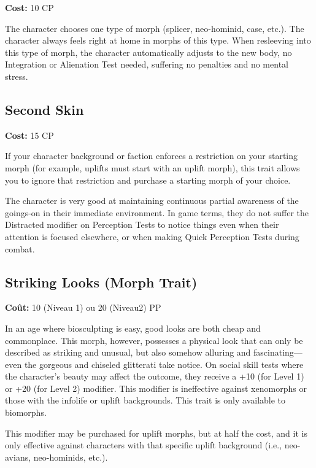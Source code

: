 \textbf{Cost:} 10 CP 

The character chooses one type of morph (splicer, neo-hominid, case, etc.). The character always feels right at home in morphs of this type. When resleeving into this type of morph, the character automatically adjusts to the new body, no Integration or Alienation Test needed, suffering no penalties and no mental stress. 

\subsection{Second Skin} \label{sec:traits-secondskin} 

\textbf{Cost:} 15 CP 

If your character background or faction enforces a restriction on your starting morph (for example, uplifts must start with an uplift morph), this trait allows you to ignore that restriction and purchase a starting morph of your choice. 





The character is very good at maintaining continuous partial awareness of the goings-on in their immediate environment. In game terms, they do not suffer the Distracted modifier on Perception Tests to notice things even when their attention is focused elsewhere, or when making Quick Perception Tests during combat. 

\subsection{Striking Looks (Morph Trait)} \label{sec:traits-striking-looks} 

\textbf{Coût:} 10 (Niveau 1) ou 20 (Niveau2) PP 

In an age where biosculpting is easy, good looks are both cheap and commonplace. This morph, however, possesses a physical look that can only be described as striking and unusual, but also somehow alluring and fascinating—even the gorgeous and chiseled glitterati take notice. On social skill tests where the character’s beauty may affect the outcome, they receive a +10 (for Level 1) or +20 (for Level 2) modifier. This modifier is ineffective against xenomorphs or those with the infolife or uplift backgrounds. This trait is only available to biomorphs. 

This modifier may be purchased for uplift morphs, but at half the cost, and it is only effective against characters with that specific uplift background (i.e., neo-avians, neo-hominids, etc.). 

